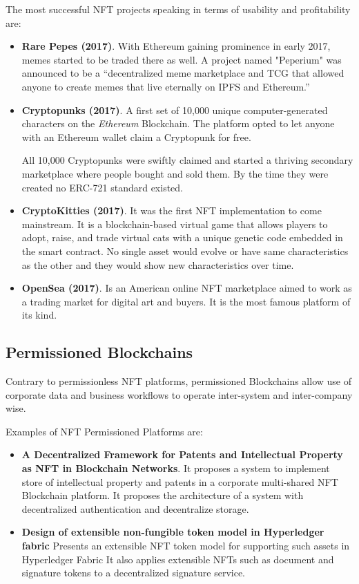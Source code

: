 The most successful NFT projects speaking in terms of usability and profitability are:
\begin{itemize}
    \item \textbf{Rare Pepes (2017)}. With Ethereum gaining prominence in early 2017, memes started to be traded there as well. A project named "Peperium" was announced to be a “decentralized meme marketplace and \ac{TCG} that allowed anyone to create memes that live eternally on IPFS and Ethereum.”
    \item \textbf{Cryptopunks (2017)}. A first set of 10,000 unique computer-generated characters on the \emph{Ethereum} Blockchain. The platform opted to let anyone with an Ethereum wallet claim a Cryptopunk for free.
    
    All 10,000 Cryptopunks were swiftly claimed and started a thriving secondary marketplace where people bought and sold them. By the time they were created no \ac{ERC}-721 standard existed.
    \item \textbf{CryptoKitties (2017)}. It was the first NFT implementation to come mainstream. It is a blockchain-based virtual game that allows players to adopt, raise, and trade virtual cats with a unique genetic code embedded in the smart contract. No single asset would evolve or have same characteristics as the other and they would show new characteristics over time. 
    \item \textbf{OpenSea (2017)}. Is an American online \ac{NFT} marketplace aimed to work as a trading market for digital art and buyers. It is the most famous platform of its kind.
\end{itemize}

\subsection{Permissioned Blockchains}
Contrary to permissionless NFT platforms, permissioned Blockchains allow use of corporate data and business workflows to operate inter-system and inter-company wise.

Examples of NFT Permissioned Platforms are:
\begin{itemize}
    \item  \textbf{A Decentralized Framework for Patents and
Intellectual Property as NFT in Blockchain Networks}\cite{bamakan2021decentralized}. It proposes a system to implement store of intellectual property and patents in a corporate multi-shared NFT Blockchain platform. It proposes the architecture of a system with decentralized authentication and decentralize storage.
    \item \textbf{Design of extensible non-fungible token model in Hyperledger fabric}\cite{hong2019design}
    Presents an extensible \ac{NFT} token model for supporting such assets in Hyperledger Fabric It also applies extensible NFTs such as document and signature tokens to a decentralized signature service.
\end{itemize}